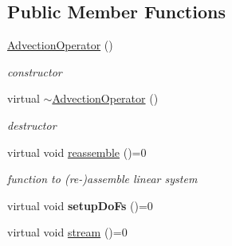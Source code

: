 \subsection*{Public Member Functions}
\begin{DoxyCompactItemize}
\item 
\hypertarget{classnatrium_1_1AdvectionOperator_a48d3a57e3433d9f6c3768ad2f392df56}{
\hyperlink{classnatrium_1_1AdvectionOperator_a48d3a57e3433d9f6c3768ad2f392df56}{AdvectionOperator} ()}
\label{classnatrium_1_1AdvectionOperator_a48d3a57e3433d9f6c3768ad2f392df56}

\begin{DoxyCompactList}\small\item\em constructor \item\end{DoxyCompactList}\item 
\hypertarget{classnatrium_1_1AdvectionOperator_a691156dace41e3075fd89953f30ae83f}{
virtual \hyperlink{classnatrium_1_1AdvectionOperator_a691156dace41e3075fd89953f30ae83f}{$\sim$AdvectionOperator} ()}
\label{classnatrium_1_1AdvectionOperator_a691156dace41e3075fd89953f30ae83f}

\begin{DoxyCompactList}\small\item\em destructor \item\end{DoxyCompactList}\item 
\hypertarget{classnatrium_1_1AdvectionOperator_a89c25c3dae9a1e5973cd89fab8c2c052}{
virtual void \hyperlink{classnatrium_1_1AdvectionOperator_a89c25c3dae9a1e5973cd89fab8c2c052}{reassemble} ()=0}
\label{classnatrium_1_1AdvectionOperator_a89c25c3dae9a1e5973cd89fab8c2c052}

\begin{DoxyCompactList}\small\item\em function to (re-\/)assemble linear system \item\end{DoxyCompactList}\item 
\hypertarget{classnatrium_1_1AdvectionOperator_adcd3e1a5bfd9fc4bc2bbc09c02c0f248}{
virtual void {\bfseries setupDoFs} ()=0}
\label{classnatrium_1_1AdvectionOperator_adcd3e1a5bfd9fc4bc2bbc09c02c0f248}

\item 
\hypertarget{classnatrium_1_1AdvectionOperator_aacdf6096f40166c5ec64686655c906a0}{
virtual void \hyperlink{classnatrium_1_1AdvectionOperator_aacdf6096f40166c5ec64686655c906a0}{stream} ()=0}
\label{classnatrium_1_1AdvectionOperator_aacdf6096f40166c5ec64686655c906a0}


\end{DoxyCompactItemize}
